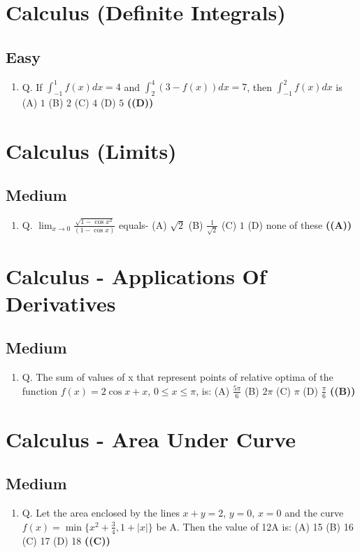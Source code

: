 \documentclass{article}
\begin{document}
\section{Calculus (Definite Integrals)}
\subsection{Easy}
\begin{enumerate}
\item Q. If $\int_{-1}^1 f(x)dx = 4$ and $\int_2^4 (3 - f(x))dx = 7$, then $\int_{-1}^2 f(x)dx$ is
(A) $1$
(B) $2$
(C) $4$
(D) $5$ \hfill \textbf{((D))}
\end{enumerate}
\section{Calculus (Limits)}
\subsection{Medium}
\begin{enumerate}
\item Q. $\lim_{x\to 0} \frac{\sqrt{1-\cos x^2}}{(1-\cos x)}$ equals-
(A) $\sqrt{2}$
(B) $\frac{1}{\sqrt{2}}$
(C) $1$
(D) none of these \hfill \textbf{((A))}
\end{enumerate}
\section{Calculus - Applications Of Derivatives}
\subsection{Medium}
\begin{enumerate}
\item Q. The sum of values of x that represent points of relative optima of the function $f(x) = 2 \cos x + x$, $0 \le x \le \pi$, is:
(A) $\frac{5\pi}{6}$
(B) $2\pi$
(C) $\pi$
(D) $\frac{\pi}{6}$ \hfill \textbf{((B))}
\end{enumerate}
\section{Calculus - Area Under Curve}
\subsection{Medium}
\begin{enumerate}
\item Q. Let the area enclosed by the lines $x + y = 2$, $y = 0$, $x = 0$ and the curve $f(x) = \min\{x^2 + \frac{3}{4}, 1 + |x|\}$ be A. Then the value of 12A is:
(A) 15
(B) 16
(C) 17
(D) 18 \hfill \textbf{((C))}
\end{enumerate}
\end{document}
